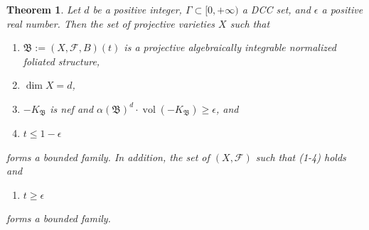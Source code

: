 \documentclass[11pt,reqno]{amsart}
\numberwithin{equation}{section}
\newcommand{\vol}{\operatorname{vol}}
\newcommand{\Bb}{{\mathfrak{B}}}
\newcommand{\Ff}{\mathcal{F}}
\newcommand{\Ii}{\Gamma}
\newtheorem{thm}{Theorem}[section]
\theoremstyle{definition}
\begin{document}
\begin{thm}\label{thm: jiang principle general}
Let $d$ be a positive integer, $\Ii\subset [0,+\infty)$ a DCC set, and $\epsilon$ a positive real number. Then the set of projective varieties $X$ such that
\begin{enumerate}
    \item $\Bb:=(X,\Ff,B)(t)$ is a projective algebraically integrable normalized foliated structure,
    \item $\dim X=d$,
    \item $-K_{\Bb}$ is nef and $\alpha(\Bb)^d\cdot\vol(-K_{\Bb})\geq\epsilon$, and
    \item $t\leq 1-\epsilon$
\end{enumerate}
forms a bounded family. In addition, the set of $(X,\Ff)$ such that (1-4) holds and 
\begin{enumerate}
    \item[(5)] $t\geq\epsilon$
\end{enumerate}
forms a bounded family.
\end{thm}
\end{document}
